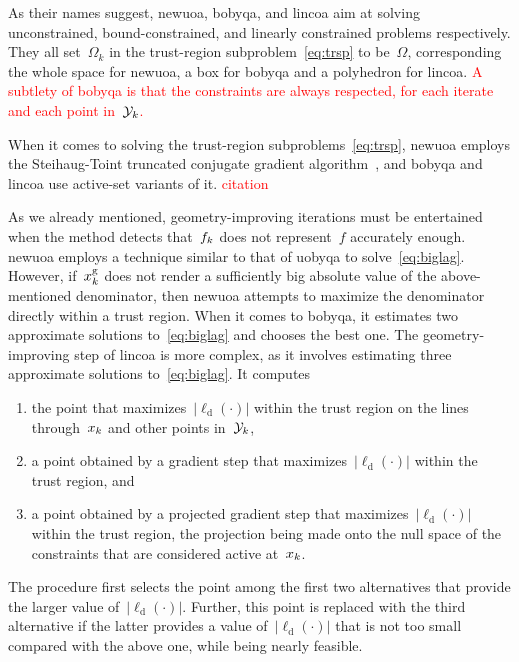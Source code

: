\documentclass[
    smallextended,  %
    final,        %
]{svjour3}
\newcommand{\abs}[2][]{#1\lvert#2#1\rvert}
\newcommand{\drop}{{\text{d}}}
\newcommand{\fsetm}[1][k]{\Omega_{#1}}
\newcommand{\fset}{\Omega}
\newcommand{\geo}{{\text{g}}}
\newcommand{\iter}[1][k]{x\ifthenelse{\equal{#1}{}}{}{_{#1}}}
\newcommand{\objm}[1][k]{\obj\ifthenelse{\equal{#1}{}}{}{_{#1}}}
\newcommand{\obj}{f}
\newcommand{\xpt}[1][k]{\mathcal{Y}\ifthenelse{\equal{#1}{}}{}{_{#1}}}
\newcommand{\red}{\textcolor{red}}
\begin{document}
As their names suggest, \gls{newuoa}, \gls{bobyqa}, and \gls{lincoa} aim at solving unconstrained,
bound-constrained, and linearly constrained problems respectively.
They all set~$\fsetm$ in the trust-region subproblem~\eqref{eq:trsp} to be~$\fset$, corresponding the whole space for \gls{newuoa}, a box for \gls{bobyqa} and a polyhedron for \gls{lincoa}.
\red{A subtlety of \gls{bobyqa} is that the constraints are always respected, for each iterate and
each point in~$\xpt$.}

When it comes to solving the trust-region subproblems~\eqref{eq:trsp}, \gls{newuoa} employs the
Steihaug-Toint truncated conjugate gradient algorithm~\cite{Steihaug_1983,Toint_1981}, and
\gls{bobyqa} and \gls{lincoa} use active-set variants of it. \red{citation}

As we already mentioned, geometry-improving iterations must be entertained when the method detects that~$\objm$ does not represent~$\obj$ accurately enough.
\Gls{newuoa} employs a technique similar to that of \gls{uobyqa} to solve~\eqref{eq:biglag}.
However, if~$\iter^{\geo}$ does not render a sufficiently big absolute value of the above-mentioned denominator, then \gls{newuoa} attempts to maximize the denominator directly within a trust region.
When it comes to \gls{bobyqa}, it estimates two approximate solutions to~\eqref{eq:biglag} and chooses the best one.
The geometry-improving step of \gls{lincoa} is more complex, as it involves estimating three approximate solutions to~\eqref{eq:biglag}.
It computes
\begin{enumerate}
    \item the point that maximizes~$\abs{\ell_{\drop}(\cdot)}$ within the trust region on the lines through~$\iter$ and other points in~$\xpt$,
    \item a point obtained by a gradient step that maximizes~$\abs{\ell_{\drop}(\cdot)}$ within the trust region, and
    \item a point obtained by a projected gradient step that maximizes~$\abs{\ell_{\drop}(\cdot)}$ within the trust region, the projection being made onto the null space of the constraints that are considered active at~$\iter$.
\end{enumerate}
The procedure first selects the point among the first two alternatives that provide the larger value of~$\abs{\ell_{\drop}(\cdot)}$.
Further, this point is replaced with the third alternative if the latter provides a value of~$\abs{\ell_{\drop}(\cdot)}$ that is not too small compared with the above one, while being nearly feasible.
\end{document}
